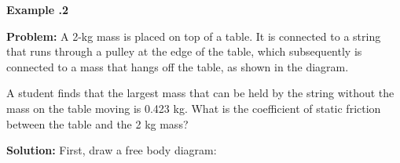 	\begin{mdframed}[backgroundcolor=blue!10!white]
		\begin{center}
		
			
			\textbf{Example \thesection.2}	
		\end{center}
		
		\textbf{Problem: } A 2-kg mass is placed on top of a table.  It is connected to a string that runs through a pulley at the edge of the table, which subsequently is connected to a mass that hangs off the table, as shown in the diagram. 
		
		\begin{center}
			
	\end{center}	
		
		
		  A student finds that the largest mass that can be held by the string without the mass on the table moving is 0.423 kg.  What is the coefficient of static friction between the table and the 2 kg mass?
		\vspace{0.1in}
		
		\textbf{Solution:} 
		First, draw a free body diagram:
		
		\begin{center}
			
		
				
\end{center}
\end{mdframed}
